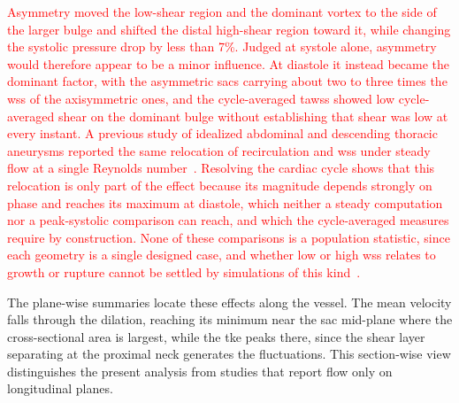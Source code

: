 \documentclass[12pt,a4paper]{article}
\newcommand{\WSS}{\ac{wss}\xspace}
\newcommand{\TAWSS}{\ac{tawss}\xspace}
\newcommand{\TKE}{\ac{tke}\xspace}
\theoremstyle{definition}
\numberwithin{equation}{section}
\newcommand{\revision}[1]{\textcolor{red}{#1}}
\begin{document}
\revision{Asymmetry moved the low-shear region and the dominant vortex to the side of the larger bulge and shifted the distal high-shear region toward it, while changing the systolic pressure drop by less than 7\%. Judged at systole alone, asymmetry would therefore appear to be a minor influence. At diastole it instead became the dominant factor, with the asymmetric sacs carrying about two to three times the \WSS of the axisymmetric ones, and the cycle-averaged \TAWSS showed low cycle-averaged shear on the dominant bulge without establishing that shear was low at every instant. A previous study of idealized abdominal and descending thoracic aneurysms reported the same relocation of recirculation and \WSS under steady flow at a single Reynolds number~\cite{rehman2024comparative}. Resolving the cardiac cycle shows that this relocation is only part of the effect because its magnitude depends strongly on phase and reaches its maximum at diastole, which neither a steady computation nor a peak-systolic comparison can reach, and which the cycle-averaged measures require by construction. None of these comparisons is a population statistic, since each geometry is a single designed case, and whether low or high \WSS relates to growth or rupture cannot be settled by simulations of this kind~\cite{geers2017wall,lipp2020computational}.}

The plane-wise summaries locate these effects along the vessel. The mean velocity falls through the dilation, reaching its minimum near the sac mid-plane where the cross-sectional area is largest, while the \TKE peaks there, since the shear layer separating at the proximal neck generates the fluctuations. This section-wise view distinguishes the present analysis from studies that report flow only on longitudinal planes.
\end{document}

